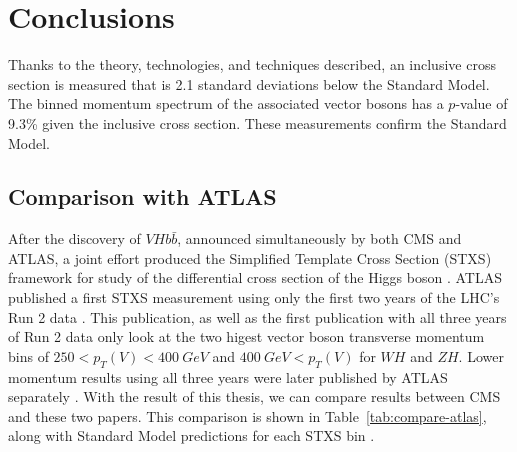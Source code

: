 \chapter{Conclusions} \label{ch:conclusion}

Thanks to the theory, technologies, and techniques described,
an inclusive cross section is measured that is 2.1 standard deviations below the Standard Model.
The binned momentum spectrum of the associated vector bosons
has a $p$-value of 9.3\% given the inclusive cross section.
These measurements confirm the Standard Model.

\section{Comparison with ATLAS}

After the discovery of $V\!Hb\bar{b}$, announced simultaneously by both CMS and ATLAS,
a joint effort produced the Simplified Template Cross Section (STXS)
framework for study of the differential cross section of the Higgs boson \cite{berger2019simplified}.
ATLAS published a first STXS measurement using only the first two years of the LHC's Run 2 data \cite{Aaboud_2019}.
This publication, as well as the first publication with all three years of Run 2 data \cite{Aad:2727500}
only look at the two higest vector boson transverse momentum bins of
$250 < p_T(V) < \SI{400}{GeV}$ and $\SI{400}{GeV} < p_T(V)$ for $W\!H$ and $Z\!H$.
Lower momentum results using all three years were later published by ATLAS separately \cite{Aad:2723187}.
With the result of this thesis, we can compare results between CMS and these two papers.
This comparison is shown in Table~\ref{tab:compare-atlas},
along with Standard Model predictions for each STXS bin \cite{de2016handbook}.
%
